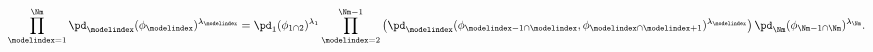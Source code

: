 \begin{equation}
  \prod_{\modelindex = 1}^{\Nm}
    \pd_{\modelindex}(\phi_{\modelindex})^{\lambda_{\modelindex}}
  = 
  \pd_{1}(\phi_{1 \cap 2})^{\lambda_{1}}
  \prod_{\modelindex = 2}^{\Nm - 1}
  \left(
    \pd_{\modelindex}(\phi_{\modelindex - 1 \cap \modelindex}, \phi_{\modelindex \cap \modelindex + 1})^{\lambda_{\modelindex}}
  \right)
  \pd_{\Nm}(\phi_{\Nm - 1 \cap \Nm})^{\lambda_{\Nm}}.
  \label{eqn:pooled-prior-log-alt-def}
\end{equation}